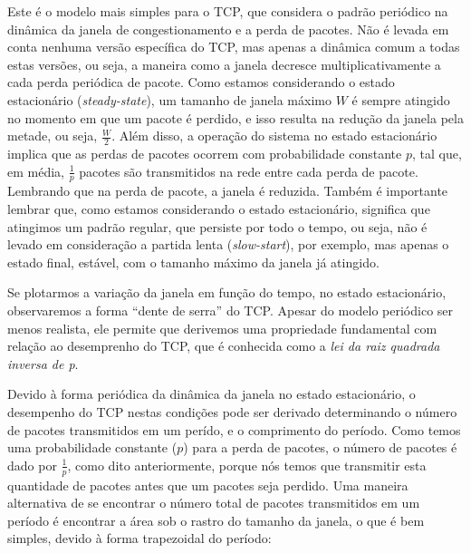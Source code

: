 

Este é o modelo mais simples para o TCP, que considera o padrão periódico na
dinâmica da janela de congestionamento e a perda de pacotes. Não é levada em
conta nenhuma versão específica do TCP, mas apenas a dinâmica comum a todas
estas versões, ou seja, a maneira como a janela decresce multiplicativamente a
cada perda periódica de pacote. Como estamos considerando o estado estacionário
(\textit{steady-state}), um tamanho de janela máximo $W$ é sempre atingido no
momento em que um pacote é perdido, e isso resulta na redução da janela pela
metade, ou seja, $\frac{W}{2}$. Além disso, a operação do sistema no estado
estacionário implica que as perdas de pacotes ocorrem com probabilidade
constante $p$, tal que, em média, $\frac{1}{p}$ pacotes são transmitidos na rede
entre cada perda de pacote. Lembrando que na perda de pacote, a janela é
reduzida. Também é importante lembrar que, como estamos considerando o estado
estacionário, significa que atingimos um padrão regular, que persiste por todo o
tempo, ou seja, não é levado em consideração a partida lenta
(\textit{slow-start}), por exemplo, mas apenas o estado final, estável, com o
tamanho máximo da janela já atingido.

Se plotarmos a variação da janela em função do tempo, no estado
estacionário, observaremos a forma ``dente de serra'' do TCP. Apesar do modelo
periódico ser menos realista, ele permite que derivemos uma propriedade
fundamental com relação ao desemprenho do TCP, que é conhecida como a
\textit{lei da raiz quadrada inversa de p}.

Devido à forma periódica da dinâmica da janela no estado estacionário, o
desempenho do TCP nestas condições pode ser derivado determinando o número de
pacotes transmitidos em um perído, e o comprimento do período. Como temos uma
probabilidade constante ($p$) para a perda de pacotes, o número de pacotes é
dado por $\frac{1}{p}$, como dito anteriormente, porque nós temos que transmitir
esta quantidade de pacotes antes que um pacotes seja perdido. Uma maneira
alternativa de se encontrar o número total de pacotes transmitidos em um período
é encontrar a área sob o rastro do tamanho da janela, o que é bem simples,
devido à forma trapezoidal do período:

